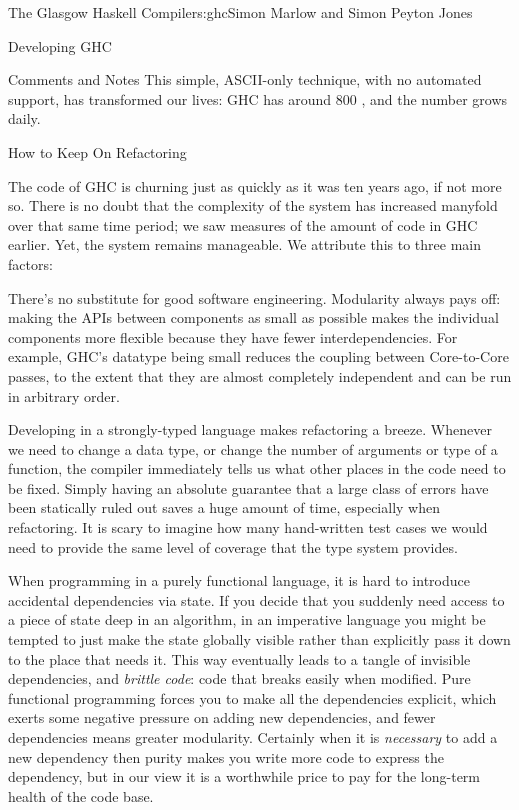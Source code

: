 \begin{aosachapter}{The Glasgow Haskell Compiler}{s:ghc}{Simon Marlow and Simon Peyton Jones}
\begin{aosasect1}{Developing GHC}
\begin{aosasect2}{Comments and Notes}
This simple, ASCII-only technique, with no automated support, has
transformed our lives: GHC has around 800 , and the number
grows daily.

\end{aosasect2}

\begin{aosasect2}{How to Keep On Refactoring}

The code of GHC is churning just as quickly as it was ten years ago, 
if not more so.  There is no doubt that the complexity of the
system has increased manyfold over that same time period; we saw
measures of the amount of code in GHC earlier.  Yet, the system
remains manageable.  We attribute this to three main factors:

\begin{aosaitemize}

\item There's no substitute for good software engineering.  Modularity
  always pays off: making the APIs between components as small as
  possible makes the individual components more flexible because they
  have fewer interdependencies.  For example, GHC's  datatype
  being small reduces the coupling between Core-to-Core passes, to the
  extent that they are almost completely independent and can be run in
  arbitrary order.

\item Developing in a strongly-typed language makes refactoring a
  breeze.  Whenever we need to change a data type, or change the
  number of arguments or type of a function, the compiler immediately
  tells us what other places in the code need to be fixed.  Simply
  having an absolute guarantee that a large class of errors have been
  statically ruled out saves a huge amount of time, especially when
  refactoring.  It is scary to imagine how many hand-written test
  cases we would need to provide the same level of coverage that the
  type system provides.

\item When programming in a purely functional language, it is hard to
  introduce accidental dependencies via state.  If you decide that you
  suddenly need access to a piece of state deep in an algorithm, in an
  imperative language you might be tempted to just make the state
  globally visible rather than explicitly pass it down to the place
  that needs it.  This way eventually leads to a tangle of invisible
  dependencies, and \emph{brittle code}: code that breaks easily when
  modified.  Pure functional programming forces you to make all the
  dependencies explicit, which exerts some negative pressure on adding
  new dependencies, and fewer dependencies means greater modularity.
  Certainly when it is \emph{necessary} to add a new dependency then
  purity makes you write more code to express the dependency, but in
  our view it is a worthwhile price to pay for the long-term health of
  the code base.


\end{aosaitemize}
\end{aosasect2}
\end{aosasect1}
\end{aosachapter}
